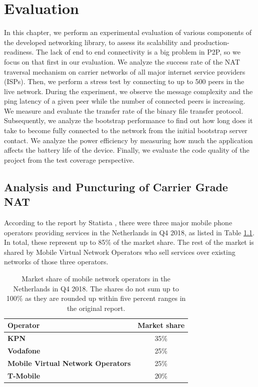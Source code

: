 
\chapter{Evaluation}
\label{evaluation}

In this chapter, we perform an experimental evaluation of various components of the developed networking library, to assess its scalability and production-readiness. The lack of end to end connectivity is a big problem in P2P, so we focus on that first in our evaluation. We analyze the success rate of the NAT traversal mechanism on carrier networks of all major internet service providers (ISPs). Then, we perform a stress test by connecting to up to 500 peers in the live network. During the experiment, we observe the message complexity and the ping latency of a given peer while the number of connected peers is increasing. We measure and evaluate the transfer rate of the binary file transfer protocol. Subsequently, we analyze the bootstrap performance to find out how long does it take to become fully connected to the network from the initial bootstrap server contact. We analyze the power efficiency by measuring how much the application affects the battery life of the device. Finally, we evaluate the code quality of the project from the test coverage perspective.

\section{Analysis and Puncturing of Carrier Grade NAT}

According to the report by Statista \cite{statista:marketshare}, there were three major mobile phone operators providing services in the Netherlands in Q4 2018, as listed in Table \ref{table_marketshare}. In total, these represent up to 85\% of the market share. The rest of the market is shared by Mobile Virtual Network Operators who sell services over existing networks of those three operators.

\begin{table}
    \centering
    \begin{tabular}{ | l | c | }
        \hline
        \textbf{Operator} & \textbf{Market share} \\
        \hline
        \textbf{KPN} & 35\% \\
        \textbf{Vodafone} & 25\% \\
        \textbf{Mobile Virtual Network Operators} & 25\% \\
        \textbf{T-Mobile} & 20\% \\
        \hline
    \end{tabular}
    \caption{Market share of mobile network operators in the Netherlands in Q4 2018. The shares do not sum up to 100\% as they are rounded up within five percent ranges in the original report. \cite{statista:marketshare}}
    \label{table_marketshare}
\end{table}

